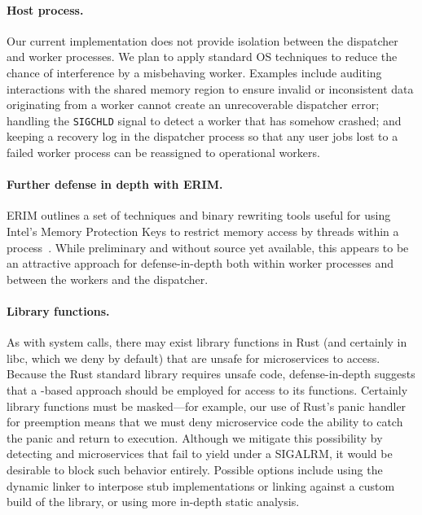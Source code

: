 \paragraph{Host process.}
Our current implementation does not provide isolation between the dispatcher
and worker processes.  We plan to apply standard OS techniques to reduce
the chance of interference by a misbehaving worker.  Examples
include auditing interactions with the shared memory region to ensure invalid
or inconsistent data originating from a worker cannot create an unrecoverable
dispatcher error; handling the \texttt{SIGCHLD} signal to detect a worker that has
somehow crashed; and keeping a recovery log in the dispatcher process so that any
user jobs lost to a failed worker process can be reassigned to operational
workers.  

\paragraph{Further defense in depth with ERIM.}
ERIM outlines a set of techniques and binary rewriting tools useful for using
Intel's Memory Protection Keys to restrict memory access by 
threads within a process~\cite{vahldiek2018erim}.  While preliminary and without
source yet available, this appears to be an attractive approach for
defense-in-depth both within worker processes and between the workers and the dispatcher.



\paragraph{Library functions.}
As with system calls, there may exist library functions in Rust (and certainly
in libc, which we deny by default) that are unsafe for microservices to access.
Because the Rust standard library requires unsafe
code, defense-in-depth suggests that a -based approach should be
employed for access to its functions.  Certainly library functions must
be masked---for example, our use of Rust's panic handler for
preemption means that we must deny microservice code the ability to catch the
panic and return to execution.  Although we mitigate this possibility by
detecting and  microservices that fail to yield under a SIGALRM, it
would be desirable to block such behavior entirely.
Possible
options include using the dynamic linker to interpose stub implementations or
linking against a custom build of the library, or using more in-depth static analysis.



